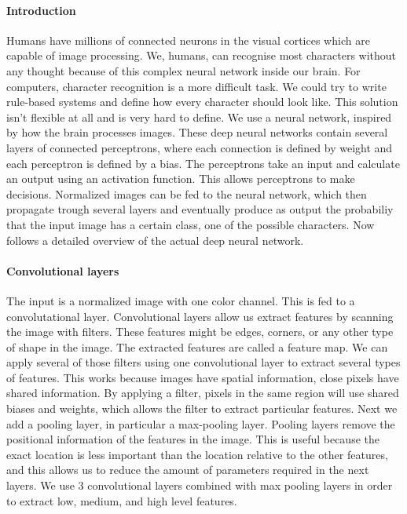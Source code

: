 \documentclass{article}
\begin{document}
\paragraph{Introduction}
Humans have millions of connected neurons in the visual cortices which are capable of image processing.
We, humans, can recognise most characters without any thought because of this complex neural network inside our brain. 
For computers, character recognition is a more difficult task. We could try to write rule-based systems and define how every character should look like. This solution isn't flexible at all and is very hard to define.
We use a neural network, inspired by how the brain processes images. These deep neural networks contain several layers of connected perceptrons, where each connection is defined by weight and each perceptron is defined by a bias. 
The perceptrons take an input and calculate an output using an activation function. This allows perceptrons to make decisions. 
Normalized images can be fed to the neural network, which then propagate trough several layers and eventually produce as output the probabiliy that the input image has a certain class, one of the possible characters. 
Now follows a detailed overview of the actual deep neural network.

\paragraph{Convolutional layers}
 The input is a normalized image with one color channel. This is fed to a convolutational layer. Convolutional layers allow us extract features by scanning the image with filters. These features might be edges, corners, or any other type of shape in the image. The extracted features are called a feature map. 
 We can apply several of those filters using one convolutional layer to extract several types of features. 
 This works because images have spatial information, close pixels have shared information. By applying a filter, pixels in the same region will use shared biases and weights, which allows the filter to extract particular features. 
 Next we add a pooling layer, in particular a max-pooling layer. Pooling layers remove the positional information of the features in the image. This is useful because the exact location is less important than the location relative to the other features, and this allows us to reduce the amount of parameters required in the next layers. 
We use 3 convolutional layers combined with max pooling layers in order to extract low, medium, and high level features. 
\end{document}
